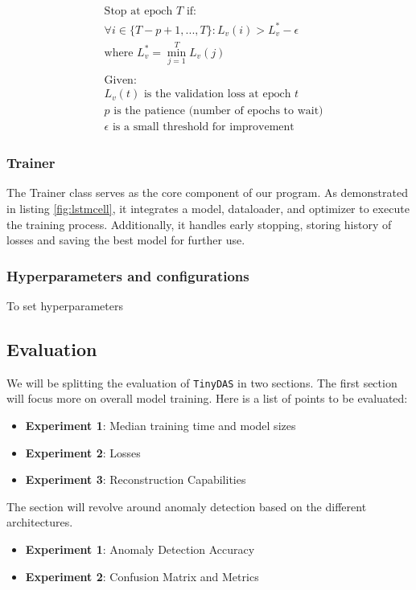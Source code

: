 \begin{align*}
&\text{Stop at epoch } T \text{ if:} \\
&\forall i \in \{T-p+1, ..., T\}: L_v(i) > L_v^* - \epsilon \\
&\text{where } L_v^* = \min_{j=1}^{T} L_v(j) \\
\\
&\text{Given:} \\
&L_v(t) \text{ is the validation loss at epoch } t \\
&p \text{ is the patience (number of epochs to wait)} \\
&\epsilon \text{ is a small threshold for improvement}
\end{align*}

\subsubsection{Trainer}

The Trainer class serves as the core component of our program. As demonstrated in listing \ref{fig:lstmcell}, it integrates a model, dataloader, and optimizer to execute the training process. Additionally, it handles early stopping, storing history of losses and saving the best model for further use.

\subsubsection{Hyperparameters and configurations}

To set hyperparameters 

\subsection{Evaluation}

We will be splitting the evaluation of \texttt{TinyDAS} in two sections. The first section will focus more on overall model training. Here is a list of points to be evaluated: 

\begin{itemize}
    \item \textbf{Experiment 1}: Median training time and model sizes
    \item \textbf{Experiment 2}: Losses
    \item \textbf{Experiment 3}: Reconstruction Capabilities
\end{itemize}

The section will revolve around anomaly detection based on the different architectures.

\begin{itemize}
    \item \textbf{Experiment 1}: Anomaly Detection Accuracy
    \item \textbf{Experiment 2}: Confusion Matrix and Metrics
\end{itemize}

